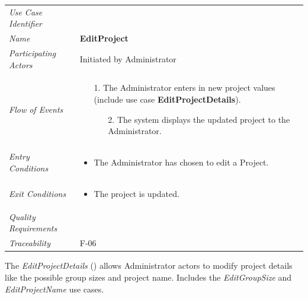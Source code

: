 \documentclass[12pt,letterpaper]{article}
\begin{document}
\begin{center}
	\begin{tabu} to 
		\toprule
		Use Case Identifier &  \\
		Name & {\bf EditProject} \\
		Participating Actors & Initiated by Administrator \\
		Flow of Events & 
		\begin{minipage}[t]{\linewidth}
		    \begin{enumerate}
		        \item[1.] The Administrator enters in new project values (include use case \textbf{EditProjectDetails}).
			    \begin{enumerate}
			        \item[2.] The system displays the updated project to the Administrator.
			    \end{enumerate}
			\end{enumerate}
		\end{minipage} \\

		Entry Conditions &
		\begin{minipage}[t]{\linewidth}
			\begin{itemize}
			    \item The Administrator has chosen to edit a Project.
	        \end{itemize}
		\end{minipage} \\

		Exit Conditions &
        \begin{minipage}[t]{\linewidth}
			\begin{itemize}
			    \item The project is updated.
	        \end{itemize}
		\end{minipage} \\

		Quality Requirements & \\

		Traceability & F-06 \\
		\toprule
	\end{tabu}
\end{center}

The {\it EditProjectDetails} () allows Administrator actors to modify project details like the possible group sizes and project name. Includes the {\it EditGroupSize} and {\it EditProjectName} use cases.
\end{document}
